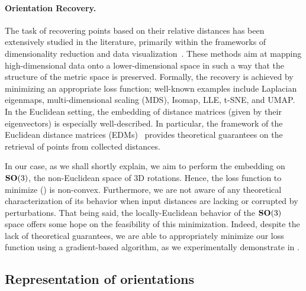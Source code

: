 \paragraph{Orientation Recovery.}
The task of recovering points based on their relative distances has been extensively studied in the literature, primarily within the frameworks of dimensionality reduction and data visualization~\cite{belkin2003laplacian,kruskal1978multidimensional, maaten2008visualizing, mcinnes2018umap,dokmanic2015euclidean}.
These methods aim at mapping high-dimensional data onto a lower-dimensional space in such a way that the structure of the metric space is preserved.
Formally, the recovery is achieved by minimizing an appropriate loss function; well-known examples include Laplacian eigenmaps, multi-dimensional scaling (MDS), Isomap, LLE, t-SNE, and UMAP.
In the Euclidean setting, the embedding of distance matrices (given by their eigenvectors) is especially well-described.
In particular, the framework of the Euclidean distance matrices (EDMs)~\cite{dokmanic2015euclidean} provides theoretical guarantees on the retrieval of points from collected distances.

In our case, as we shall shortly explain, we aim to perform the embedding on $\mathrm{\mathbf{SO}}(3)$, the non-Euclidean space of 3D rotations. Hence, the loss function to minimize () is non-convex. Furthermore, we are not aware of any theoretical characterization of its behavior when input distances are lacking or corrupted by perturbations. That being said, the locally-Euclidean behavior of the $\mathrm{\mathbf{SO}}(3)$ space offers some hope on the feasibility of this minimization.
Indeed, despite the lack of theoretical guarantees, we are able to appropriately minimize our loss function using a gradient-based algorithm, as we experimentally demonstrate in .


\subsection{Representation of orientations}\label{sec:method:orientation-representation}

